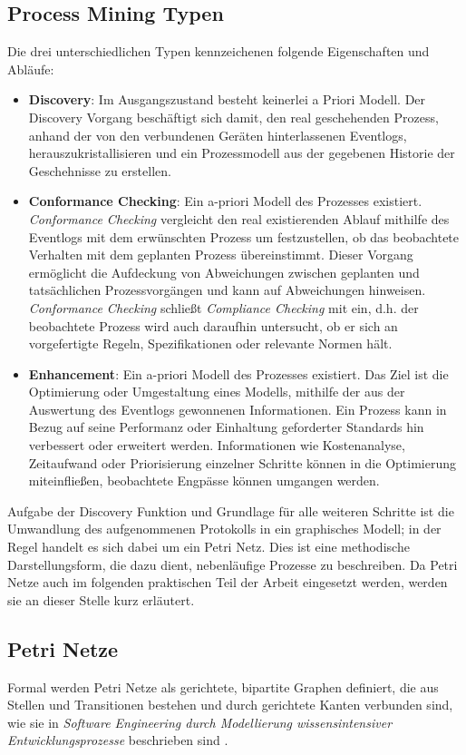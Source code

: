 \newpage
\subsection{Process Mining Typen}
Die drei unterschiedlichen Typen kennzeichenen folgende Eigenschaften und Abläufe:
\begin{itemize}
\item \textbf{Discovery}: Im Ausgangszustand besteht keinerlei a Priori Modell. Der Discovery Vorgang beschäftigt sich damit, den real geschehenden Prozess, anhand der von den verbundenen Geräten hinterlassenen Eventlogs, herauszukristallisieren und ein Prozessmodell aus der gegebenen Historie der Geschehnisse zu erstellen.

\item \textbf{Conformance Checking}: Ein a-priori Modell des Prozesses existiert. \textit{Conformance Checking} vergleicht den real existierenden Ablauf mithilfe des Eventlogs mit dem erwünschten Prozess um festzustellen, ob das beobachtete Verhalten mit dem geplanten Prozess übereinstimmt. Dieser Vorgang ermöglicht die Aufdeckung von Abweichungen zwischen geplanten und tatsächlichen Prozessvorgängen und kann auf Abweichungen hinweisen.  \textit{Conformance Checking} schließt \textit{Compliance Checking} mit ein, d.h. der beobachtete Prozess wird auch daraufhin untersucht, ob er sich an vorgefertigte Regeln, Spezifikationen oder relevante Normen hält.

\item \textbf{Enhancement}: Ein a-priori Modell des Prozesses existiert. Das Ziel ist die Optimierung oder Umgestaltung eines Modells, mithilfe der aus der Auswertung des Eventlogs gewonnenen Informationen. Ein Prozess kann in Bezug auf seine Performanz oder Einhaltung geforderter Standards hin verbessert oder erweitert werden. Informationen wie Kostenanalyse, Zeitaufwand oder Priorisierung einzelner Schritte können in die Optimierung miteinfließen, beobachtete Engpässe können umgangen werden.
\end{itemize}

Aufgabe der Discovery Funktion und Grundlage für alle weiteren Schritte ist die Umwandlung des aufgenommenen Protokolls in ein graphisches Modell; in der Regel handelt es sich dabei um ein Petri Netz. Dies ist eine methodische Darstellungsform, die dazu dient, nebenläufige Prozesse zu beschreiben. Da Petri Netze auch im folgenden praktischen Teil der Arbeit eingesetzt werden, werden sie an dieser Stelle kurz erläutert.

\subsection{Petri Netze}
Formal werden Petri Netze als gerichtete, bipartite Graphen definiert, die aus Stellen  und  Transitionen  bestehen und durch  gerichtete  Kanten  verbunden sind, wie sie in \textit{Software Engineering durch Modellierung wissensintensiver Entwicklungsprozesse} beschrieben sind \cite{freund2007software}. 

